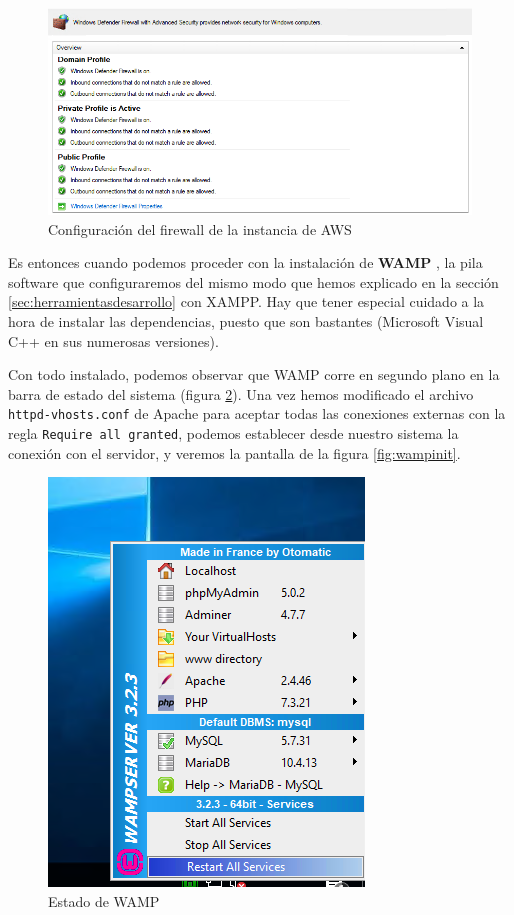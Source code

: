\begin{figure}
	\centering
	\includegraphics[width=\linewidth]{img/firewall}
	\caption{Configuración del firewall de la instancia de AWS}
	\label{fig:firewall}
\end{figure}

Es entonces cuando podemos proceder con la instalación de \textbf{WAMP} \cite{wamp}, la pila software que configuraremos del mismo modo que hemos explicado en la sección \ref{sec:herramientasdesarrollo} con XAMPP. Hay que tener especial cuidado a la hora de instalar las dependencias, puesto que son bastantes (Microsoft Visual C++ en sus numerosas versiones).

Con todo instalado, podemos observar que WAMP corre en segundo plano en la barra de estado del sistema (figura \ref{fig:wamp}). Una vez hemos modificado el archivo \\ \texttt{httpd-vhosts.conf} de Apache para aceptar todas las conexiones externas con la regla \texttt{Require all granted}, podemos establecer desde nuestro sistema la conexión con el servidor, y veremos la pantalla de la figura \ref{fig:wampinit}.

\begin{figure}
	\centering
	\includegraphics{img/wamp}
	\caption{Estado de WAMP}
	\label{fig:wamp}
\end{figure}

